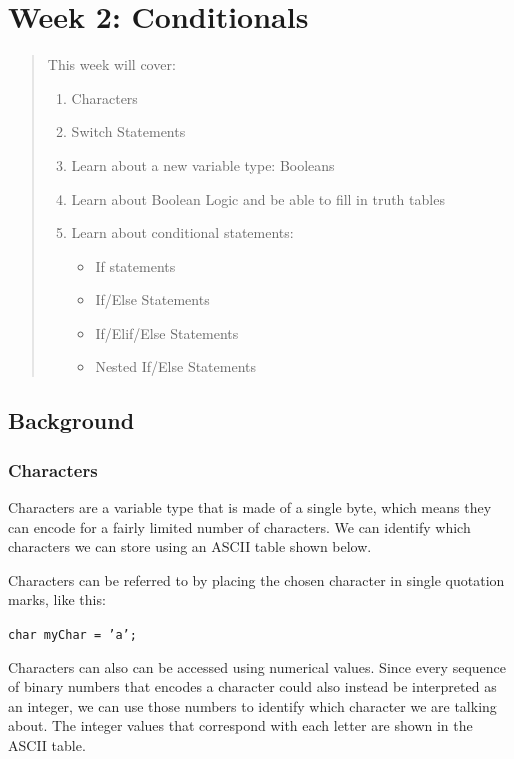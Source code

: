 \chapter*{Week 2: Conditionals}
\setcounter{chapter}{2}
\setcounter{section}{0}

\begin{abstract}
This week will cover:
\begin{enumerate}
    \item Characters 
    \item Switch Statements
    \item Learn about a new variable type: Booleans
    \item Learn about Boolean Logic and be able to fill in truth tables
    \item Learn about conditional statements:
    \begin{itemize}
        \item If statements
        \item If/Else Statements
        \item If/Elif/Else Statements
        \item Nested If/Else Statements
    \end{itemize}
\end{enumerate}
    
\end{abstract}

\section{Background}

\subsection{Characters}

Characters are a variable type that is made of a single byte, which means they can encode for a fairly limited number of characters. We can identify which characters we can store using an ASCII table shown below. 

Characters can be referred to by placing the chosen character in single quotation marks, like this:

\texttt{char myChar = 'a';}

Characters can also can be accessed using numerical values. Since every sequence of binary numbers that encodes a character could also instead be interpreted as an integer, we can use those numbers to identify which character we are talking about. The integer values that correspond with each letter are shown in the ASCII table.

